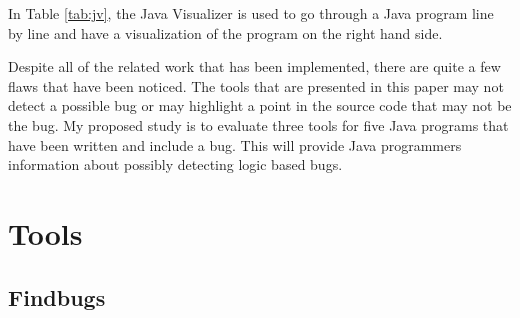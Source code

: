 In Table \ref{tab:jv}, the Java Visualizer is used to go through a Java program line by line and  have a visualization of the program on the right hand side.

Despite all of the related work that has been implemented, there are quite a few flaws that have been noticed. The tools that are presented in this paper may not detect a possible bug or may highlight a point in the source code that may not be the bug. My proposed study is to evaluate three tools for five Java programs that have been written and include a bug. This will provide Java programmers information about possibly detecting logic based bugs.

\vspace*{-.1in}
\section{Tools}
\label{sec:tools}
\vspace*{-.1in}

\subsection{Findbugs}

